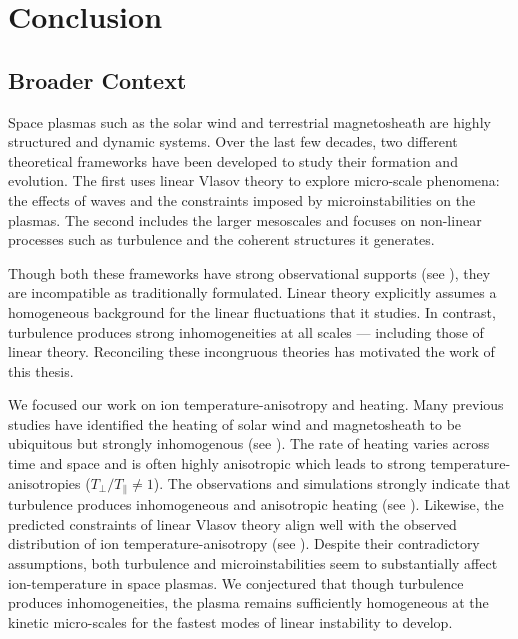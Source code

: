 %
%
\chapter{Conclusion}\label{chap:chap9}

    \section{Broader Context} \label{sec:bcc9}

        Space plasmas such as the solar wind and terrestrial magnetosheath are highly structured and
        dynamic systems. Over the last few decades, two different theoretical frameworks have been
        developed to study their formation and evolution. The first uses linear Vlasov theory to
        explore micro-scale phenomena: the effects of waves and the constraints imposed by
        microinstabilities on the plasmas. The second includes the larger mesoscales and focuses on
        non-linear processes such as turbulence and the coherent structures it generates.

        Though both these frameworks have strong observational supports (see ), they
        are incompatible as traditionally formulated. Linear theory explicitly assumes a homogeneous
        background for the linear fluctuations that it studies. In contrast, turbulence produces
        strong inhomogeneities at all scales --- including those of linear theory. Reconciling these
        incongruous theories has motivated the work of this thesis.

        We focused our work on ion temperature-anisotropy and heating. Many previous studies have
        identified the heating of solar wind and magnetosheath to be ubiquitous but strongly
        inhomogenous (see ). The rate of heating varies across time and space and
        is often highly anisotropic which leads to strong temperature-anisotropies
        ($T_{\perp}/T_{\parallel} \neq 1$). The observations and simulations strongly indicate that
        turbulence produces inhomogeneous and anisotropic heating (see ).
        Likewise, the predicted constraints of linear Vlasov theory align well with the observed
        distribution of ion temperature-anisotropy (see ). Despite their
        contradictory assumptions, both turbulence and microinstabilities seem to substantially
        affect ion-temperature in space plasmas. We conjectured that though turbulence produces
        inhomogeneities, the plasma remains sufficiently homogeneous at the kinetic micro-scales for
        the fastest modes of linear instability to develop.

